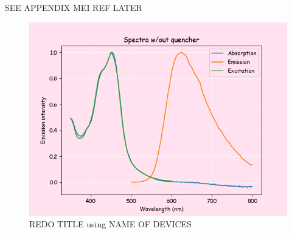 SEE APPENDIX MEI REF LATER
\begin{figure}[H]
    \centering
    \includegraphics[width = 0.7\linewidth]{part1_noq.png}
    \caption{REDO TITLE using NAME OF DEVICES}
    \label{fig:part1_noq}
\end{figure}
